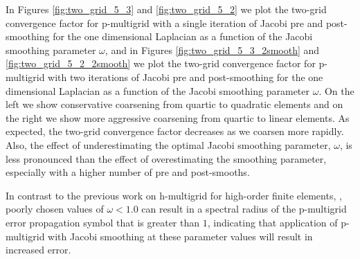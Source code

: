 \documentclass[review]{siamart190516}
\begin{document}
In Figures \ref{fig:two_grid_5_3} and \ref{fig:two_grid_5_2} we plot the two-grid convergence factor for p-multigrid with a single iteration of Jacobi pre and post-smoothing for the one dimensional Laplacian as a function of the Jacobi smoothing parameter $\omega$,
and in Figures \ref{fig:two_grid_5_3_2smooth} and \ref{fig:two_grid_5_2_2smooth} we plot the two-grid convergence factor for p-multigrid with two iterations of Jacobi pre and post-smoothing for the one dimensional Laplacian as a function of the Jacobi smoothing parameter $\omega$.
On the left we show conservative coarsening from quartic to quadratic elements and on the right we show more aggressive coarsening from quartic to linear elements.
As expected, the two-grid convergence factor decreases as we coarsen more rapidly.
Also, the effect of underestimating the optimal Jacobi smoothing parameter, $\omega$, is less pronounced than the effect of overestimating the smoothing parameter, especially with a higher number of pre and post-smooths.

In contrast to the previous work on h-multigrid for high-order finite elements, \cite{he2020two}, poorly chosen values of $\omega < 1.0$ can result in a spectral radius of the p-multigrid error propagation symbol that is greater than $1$, indicating that application of p-multigrid with Jacobi smoothing at these parameter values will result in increased error.
\end{document}
